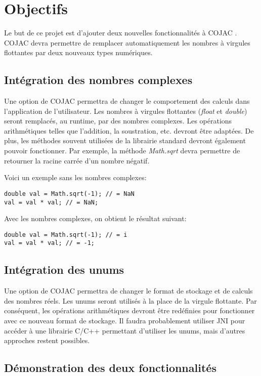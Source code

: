 \section{Objectifs}

Le but de ce projet est d'ajouter deux nouvelles fonctionnalités à COJAC \cite{COJAC}. COJAC devra permettre de remplacer automatiquement les nombres à virgules flottantes par deux nouveaux types numériques.

\subsection{Intégration des nombres complexes}

Une option de COJAC permettra de changer le comportement des calculs dans l'application de l'utilisateur. Les nombres à virgules flottantes (\textit{float} et \textit{double}) seront remplacés, au runtime, par des nombres complexes. Les opérations arithmétiques telles que l'addition, la soustration, etc. devront être adaptées. De plus, les méthodes souvent utilisées de la librairie standard devront également pouvoir fonctionner. Par exemple, la méthode \textit{Math.sqrt} devra permettre de retourner la racine carrée d'un nombre négatif.

Voici un exemple sans les nombres complexes:
\begin{verbatim}
double val = Math.sqrt(-1); // = NaN
val = val * val; // = NaN;
\end{verbatim}

Avec les nombres complexes, on obtient le résultat suivant:
\begin{verbatim}
double val = Math.sqrt(-1); // = i
val = val * val; // = -1;
\end{verbatim}

\subsection{Intégration des unums}

Une option de COJAC permettra de changer le format de stockage et de calculs des nombres réels. Les unums seront utilisés à la place de la virgule flottante. Par conséquent, les opérations arithmétiques devront être redéfinies pour fonctionner avec ce nouveau format de stockage. Il faudra probablement utiliser JNI pour accéder à une librairie C/C++ permettant d'utiliser les unums, mais d'autres approches restent possibles.

\subsection{Démonstration des deux fonctionnalités}

